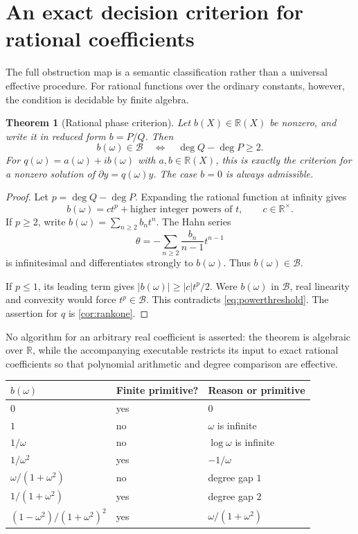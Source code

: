 \documentclass[11pt,a4paper]{article}
\newtheorem{theorem}{Theorem}[section]
\theoremstyle{definition}
\newcommand{\R}{\mathbb R}
\newcommand{\D}{\partial}
\newcommand{\BB}{\mathcal B}
\numberwithin{equation}{section}
\begin{document}
\section{An exact decision criterion for rational coefficients}
\label{sec:rational}

The full obstruction map is a semantic classification rather than a
universal effective procedure. For rational functions over the ordinary
constants, however, the condition is decidable by finite algebra.

\begin{theorem}[Rational phase criterion]\label{thm:rational}
Let $b(X)\in\R(X)$ be nonzero, and write it in reduced form
$b=P/Q$. Then
\begin{equation}\label{eq:rationalcriterion}
 b(\omega)\in\BB
 \quad\Longleftrightarrow\quad
 \deg Q-\deg P\ge2.
\end{equation}
For $q(\omega)=a(\omega)+ib(\omega)$ with $a,b\in\R(X)$, this is
exactly the criterion for a nonzero solution of $\D y=q(\omega)y$.
The case $b=0$ is always admissible.
\end{theorem}
\begin{proof}
Let $p=\deg Q-\deg P$. Expanding the rational function at infinity gives
\[
 b(\omega)=c t^p+\text{higher integer powers of }t,
 \qquad c\in\R^\times.
\]
If $p\ge2$, write $b(\omega)=\sum_{n\ge2}b_nt^n$. The Hahn series
\[
 \theta=-\sum_{n\ge2}\frac{b_n}{n-1}t^{n-1}
\]
is infinitesimal and differentiates strongly to $b(\omega)$. Thus
$b(\omega)\in\BB$.

If $p\le1$, its leading term gives
$|b(\omega)|\ge |c|t^p/2$. Were $b(\omega)$ in $\BB$, real linearity
and convexity would force $t^p\in\BB$. This contradicts
\eqref{eq:powerthreshold}. The assertion for $q$ is
\cref{cor:rankone}.
\end{proof}
No algorithm for an arbitrary real coefficient is asserted: the theorem is
algebraic over $\R$, while the accompanying executable restricts its input
to exact rational coefficients so that polynomial arithmetic and degree
comparison are effective.

\begin{center}
\begin{tabular}{lll}
\toprule
$b(\omega)$ & Finite primitive? & Reason or primitive\\
\midrule
$0$ & yes & $0$\\
$1$ & no & $\omega$ is infinite\\
$1/\omega$ & no & $\log\omega$ is infinite\\
$1/\omega^2$ & yes & $-1/\omega$\\
$\omega/(1+\omega^2)$ & no & degree gap $1$\\
$1/(1+\omega^2)$ & yes & degree gap $2$\\
$(1-\omega^2)/(1+\omega^2)^2$ & yes & $\omega/(1+\omega^2)$\\
\bottomrule
\end{tabular}
\end{center}
\end{document}
